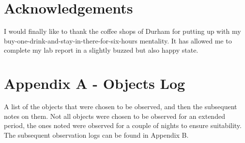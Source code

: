 \documentclass[twocolumn]{revtex4}
\begin{document}
\vspace{-5ex}
\section*{Acknowledgements}
\vspace{-2ex}
I would finally like to thank the coffee shops of Durham for putting up with my buy-one-drink-and-stay-in-there-for-six-hours mentality. It has allowed me to complete my lab report in a slightly buzzed but also happy state.





\clearpage
\onecolumngrid
\vspace{-3ex}
\section*{Appendix A - Objects Log}
\vspace{-2ex}
A list of the objects that were chosen to be observed, and then the subsequent notes on them. Not all objects were chosen to be observed for an extended period, the ones noted were observed for a couple of nights to ensure suitability. The subsequent observation logs can be found in Appendix B.
\end{document}
